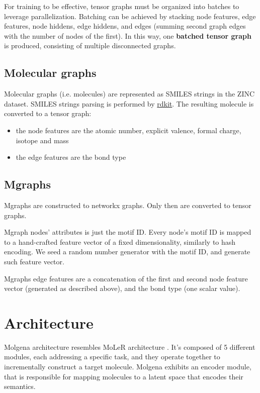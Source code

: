 \documentclass{article}
\begin{document}
For training to be effective, tensor graphs must be organized into batches to leverage parallelization.
Batching can be achieved by stacking node features, edge features, node hiddens, edge hiddens, and edges (summing second
graph edges with the number of nodes of the first).
In this way, one \textbf{batched tensor graph} is produced, consisting of multiple disconnected graphs.


\subsection{Molecular graphs}

Molecular graphs (i.e. molecules) are represented as SMILES strings in the ZINC dataset.
SMILES strings parsing is performed by \href{https://www.rdkit.org/}{rdkit}.
The resulting molecule is converted to a tensor graph:
\begin{itemize}
\item the node features are the atomic number, explicit valence, formal charge, isotope and mass
\item the edge features are the bond type
\end{itemize}

\subsection{Mgraphs}

Mgraphs are constructed to networkx graphs.
Only then are converted to tensor graphs.

Mgraph nodes' attributes is just the motif ID.
Every node's motif ID is mapped to a hand-crafted feature vector of a fixed dimensionality, similarly to hash encoding.
We seed a random number generator with the motif ID, and generate such feature vector.

Mgraphs edge features are a concatenation of the first and second node feature vector (generated as described above), and the bond type (one scalar value).

\section{Architecture}

Molgena architecture resembles MoLeR architecture \cite{microsoft2024}.
It's composed of 5 different modules, each addressing a specific task, and they operate together to incrementally construct a target molecule.
Molgena exhibits an encoder module, that is responsible for mapping molecules to a latent space that encodes their semantics.
\end{document}
